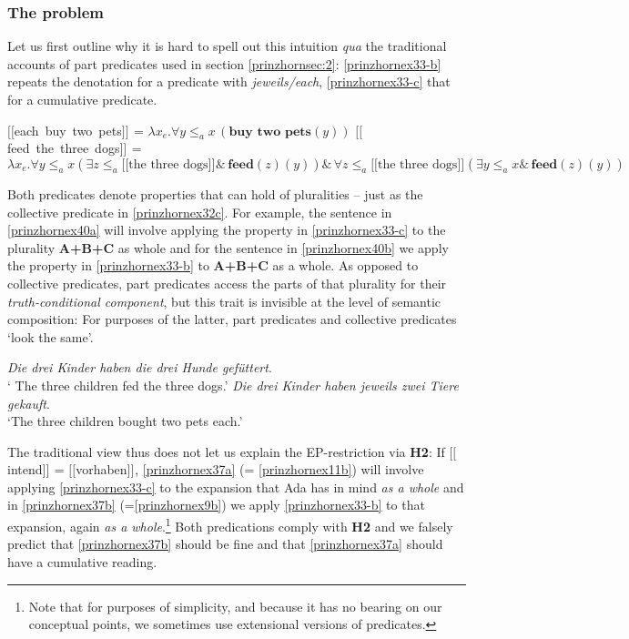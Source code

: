 \documentclass[output=paper,colorlinks,citecolor=brown,
]{langscibook}
\newcommand{\sem}[2]{\mbox{$[\![${#2}$]\!]^{#1}$}} %
\begin{document}
\subsubsection{The problem}

Let us first outline why it is hard to spell out this intuition \textit{qua} the traditional accounts of part predicates used in section \ref{prinzhornsec:2}: \ref{prinzhornex33-b} repeats the denotation for a 
 predicate with \textit{jeweils/each}, \ref{prinzhornex33-c} that for a cumulative predicate.

\ea \label{prinzhornexden}
\ea \sem{}{each buy two pets} = $\lambda x_{e}. \forall y \le_{a} x \,(\textbf{buy  two pets}(y))$\label{prinzhornex33-b}
\ex	 \sem{}{feed the three dogs} = $\lambda x_{e}. \forall y \le_{a} x (\exists z \le_{a} \sem{}{the three dogs} \&\, \textbf{feed}(z)(y)) \&\, \forall z \le_{a} \sem{}{the three dogs} (\exists y \le_{a} x \& \,\textbf{feed}(z)(y))$ \label{prinzhornex33-c}
\z\z

Both predicates denote properties that can hold of pluralities -- just as the collective predicate in \ref{prinzhornex32c}. For example, the sentence in \ref{prinzhornex40a} will involve applying the property in \ref{prinzhornex33-c} to the plurality \textbf{A+B+C} as whole and  for the sentence in \ref{prinzhornex40b} we apply the property in \ref{prinzhornex33-b} to \textbf{A+B+C} as a whole. As opposed to collective predicates, part predicates access the parts of that plurality for their \textit{truth-conditional component}, but this trait is invisible at the level of semantic composition: For purposes of the latter, part predicates and collective predicates `look the same'. 



\ea \label{prinzhornex40}
\ea \textit{Die drei Kinder haben die drei Hunde gef\"{u}ttert}.\\
` The three children fed the three dogs.' \label{prinzhornex40a}
\ex \textit{Die drei Kinder haben jeweils zwei Tiere gekauft}.\\
`The three children bought two pets each.' \label{prinzhornex40b}
\z\z

The traditional view thus does not let us explain the EP-restriction via {\bf H2}: If \sem{}{intend} = \sem{}{vorhaben},  \ref{prinzhornex37a}  (= \ref{prinzhornex11b}) will involve applying \ref{prinzhornex33-c} to the expansion that Ada has in mind \textit{as a whole} and in \ref{prinzhornex37b} (=\ref{prinzhornex9b}) we apply \ref{prinzhornex33-b} to that expansion, again \textit{as a whole}.\footnote{Note that for purposes of simplicity, and because it has no bearing on our conceptual points, we sometimes use extensional versions of predicates.} Both  predications comply with \textbf{H2} and we falsely predict that \ref{prinzhornex37b} should be fine and that \ref{prinzhornex37a} should have a cumulative reading.
\end{document}
